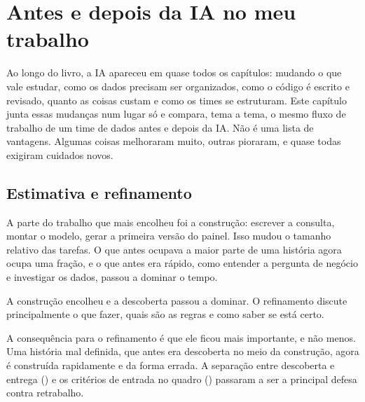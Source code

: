 \chapter{Antes e depois da IA no meu trabalho}
\label{cap:antes-depois}


Ao longo do livro, a IA apareceu em quase todos os capítulos: mudando o que vale estudar, como
os dados precisam ser organizados, como o código é escrito e revisado, quanto as coisas custam
e como os times se estruturam. Este capítulo junta essas mudanças num lugar só e compara, tema a
tema, o mesmo fluxo de trabalho de um time de dados antes e depois da IA. Não é uma lista de
vantagens. Algumas coisas melhoraram muito, outras pioraram, e quase todas exigiram cuidados
novos.

\section{Estimativa e refinamento}
\label{sec:ad-estimativa}

A parte do trabalho que mais encolheu foi a construção: escrever a consulta, montar o modelo,
gerar a primeira versão do painel. Isso mudou o tamanho relativo das tarefas. O que antes
ocupava a maior parte de uma história agora ocupa uma fração, e o que antes era rápido, como
entender a pergunta de negócio e investigar os dados, passou a dominar o tempo.

{A construção encolheu e a descoberta passou a dominar. O refinamento discute principalmente o
que fazer, quais são as regras e como saber se está certo.}

A consequência para o refinamento é que ele ficou mais importante, e não menos. Uma história mal
definida, que antes era descoberta no meio da construção, agora é construída rapidamente e da
forma errada. A separação entre descoberta e entrega () e os critérios de
entrada no quadro () passaram a ser a principal defesa contra retrabalho.

